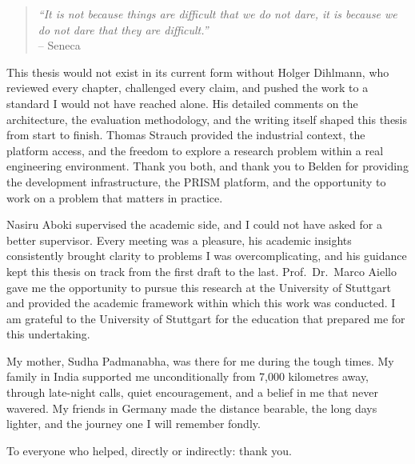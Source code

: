 \begin{quote}
\textit{``It is not because things are difficult that we do not dare, it is because we do not dare that they are difficult.''} \\ \hfill -- Seneca
\end{quote}

\bigskip

This thesis would not exist in its current form without Holger Dihlmann, who reviewed every chapter, challenged every claim, and pushed the work to a standard I would not have reached alone. His detailed comments on the architecture, the evaluation methodology, and the writing itself shaped this thesis from start to finish. Thomas Strauch provided the industrial context, the platform access, and the freedom to explore a research problem within a real engineering environment. Thank you both, and thank you to Belden for providing the development infrastructure, the PRISM platform, and the opportunity to work on a problem that matters in practice.

Nasiru Aboki supervised the academic side, and I could not have asked for a better supervisor. Every meeting was a pleasure, his academic insights consistently brought clarity to problems I was overcomplicating, and his guidance kept this thesis on track from the first draft to the last. Prof.\ Dr.\ Marco Aiello gave me the opportunity to pursue this research at the University of Stuttgart and provided the academic framework within which this work was conducted. I am grateful to the University of Stuttgart for the education that prepared me for this undertaking.

My mother, Sudha Padmanabha, was there for me during the tough times. My family in India supported me unconditionally from 7{,}000 kilometres away, through late-night calls, quiet encouragement, and a belief in me that never wavered. My friends in Germany made the distance bearable, the long days lighter, and the journey one I will remember fondly.

To everyone who helped, directly or indirectly: thank you.
